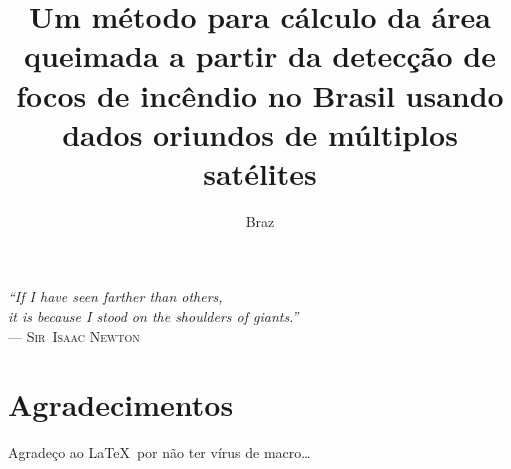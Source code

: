 \documentclass[cic,tc]{iiufrgs}
\title{Um método para cálculo da área queimada a partir da detecção de focos de incêndio no Brasil usando dados oriundos de múltiplos satélites}
\author{Braz}{José Henrique da Silva}
\begin{document}
\maketitle

\clearpage
\begin{flushright}
\mbox{}\vfill
{\sffamily\itshape
``If I have seen farther than others,\\
it is because I stood on the shoulders of giants.''\\}
--- \textsc{Sir~Isaac Newton}
\end{flushright}

\chapter*{Agradecimentos}
Agradeço ao \LaTeX\ por não ter vírus de macro\ldots

\tableofcontents
\end{document}
